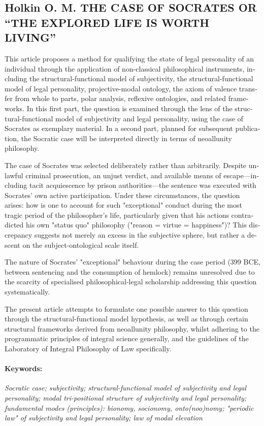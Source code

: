 \ifprintabstract
    \begin{english}
    \subsection{\texorpdfstring{\textbf{Holkin O. M. THE CASE OF SOCRATES OR “THE EXPLORED LIFE IS WORTH LIVING”}}{Holkin O. M. THE CASE OF SOCRATES OR “THE EXPLORED LIFE IS WORTH LIVING”}}
    \label{subsec:holkin-en}

    This article proposes a method for qualifying the state of legal personality of an individual through the application of non-classical philosophical instruments, including the structural-functional model of subjectivity, the structural-functional model of legal personality, projective-modal ontology, the axiom of valence transfer from whole to parts, polar analysis, reflexive ontologies, and related frameworks. In this first part, the question is examined through the lens of the structural-functional model of subjectivity and legal personality, using the case of Socrates as exemplary material. In a second part, planned for subsequent publication, the Socratic case will be interpreted directly in terms of neoallunity philosophy.

    The case of Socrates was selected deliberately rather than arbitrarily. Despite unlawful criminal prosecution, an unjust verdict, and available means of escape—including tacit acquiescence by prison authorities—the sentence was executed with Socrates' own active participation. Under these circumstances, the question arises: how is one to account for such "exceptional" conduct during the most tragic period of the philosopher's life, particularly given that his actions contradicted his own "status quo" philosophy ("reason = virtue = happiness")? This discrepancy suggests not merely an excess in the subjective sphere, but rather a descent on the subject-ontological scale itself.

    The nature of Socrates' "exceptional" behaviour during the case period (399 BCE, between sentencing and the consumption of hemlock) remains unresolved due to the scarcity of specialised philosophical-legal scholarship addressing this question systematically.

    The present article attempts to formulate one possible answer to this question through the structural-functional model hypothesis, as well as through certain structural frameworks derived from neoallunity philosophy, whilst adhering to the programmatic principles of integral science generally, and the guidelines of the Laboratory of Integral Philosophy of Law specifically.

    \paragraph{Keywords:} {\itshape Socratic case; subjectivity; structural-functional model of subjectivity and legal personality; modal tri-positional structure of subjectivity and legal personality; fundamental modes (principles): bionomy, socionomy, onto(noo)nomy; "periodic law" of subjectivity and legal personality; law of modal elevation}
    \end{english}
